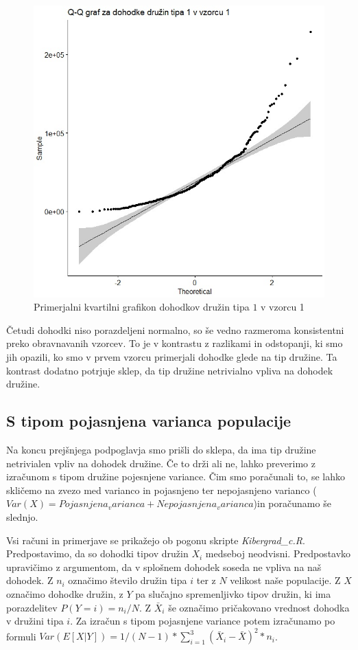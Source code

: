 \documentclass[a4paper, 10pt]{article}
\begin{document}
	\begin{figure}[h!]
		\centering
		\includegraphics[scale = 0.5]{QQVzorec1}
		\caption{Primerjalni kvartilni grafikon dohodkov družin tipa $1$ v vzorcu 1}
	\end{figure}
	
	Četudi dohodki niso porazdeljeni normalno, so še vedno razmeroma konsistentni preko obravnavanih vzorcev. To je v kontrastu z razlikami in odstopanji, ki smo jih opazili, ko smo v prvem vzorcu primerjali dohodke glede na tip družine. Ta kontrast dodatno potrjuje sklep, da tip družine netrivialno vpliva na dohodek družine. 
	
	\subsection{S tipom pojasnjena varianca populacije}
	Na koncu prejšnjega podpoglavja smo prišli do sklepa, da ima tip družine netrivialen vpliv na dohodek družine. Če to drži ali ne, lahko preverimo z izračunom s tipom družine pojesnjene variance. Čim smo poračunali to, se lahko skličemo na zvezo med varianco in pojasnjeno ter nepojasnjeno varianco ($Var(X) = Pojasnjena_varianca + Nepojasnjena_varianca$)in poračunamo še slednjo.
	
	Vsi računi in primerjave se prikažejo ob pogonu skripte \textit{Kibergrad\_c.R}. Predpostavimo, da so dohodki tipov družin $X_i$ medseboj neodvisni. Predpostavko upravičimo z argumentom, da v splošnem dohodek soseda ne vpliva na naš dohodek. Z $n_i$ označimo število družin tipa $i$ ter z $N$ velikost naše populacije. Z $X$ označimo dohodke družin, z $Y$ pa  slučajno spremenljivko tipov družin, ki ima porazdelitev $P(Y = i) = n_i / N$. Z $\bar{X}_i$ še označimo pričakovano vrednost dohodka v družini tipa $i$. Za izračun s tipom pojasnjene variance potem izračunamo po formuli $Var(E\left[X|Y\right]) = 1/(N-1) * \sum_{i = 1}^{3} (\bar{X}_i - \bar{X})^2 * n_i$.
	
	
\end{document}
